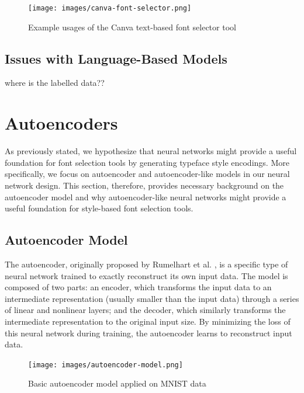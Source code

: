 \begin{figure}
    \centering
    \texttt{[image: images/canva-font-selector.png]}
    \caption{Example usages of the Canva text-based font selector tool}
    \label{fig:canva-font-selector}
\end{figure}

\subsection{Issues with Language-Based Models}

where is the labelled data??

\section{Autoencoders}

As previously stated, we hypothesize that neural networks might provide a useful foundation for font selection tools by generating typeface style encodings. More specifically, we focus on autoencoder and autoencoder-like models in our neural network design. This section, therefore, provides necessary background on the autoencoder model and why autoencoder-like neural networks might provide a useful foundation for style-based font selection tools.

\subsection{Autoencoder Model}

The autoencoder, originally proposed by Rumelhart et al. \cite{rumelhart1986}, is a specific type of neural network trained to exactly reconstruct its own input data. The model is composed of two parts: an encoder, which transforms the input data to an intermediate representation (usually smaller than the input data) through a series of linear and nonlinear layers; and the decoder, which similarly transforms the intermediate representation to the original input size. By minimizing the loss of this neural network during training, the autoencoder learns to reconstruct input data.

\begin{figure}[h]
    \centering
    \texttt{[image: images/autoencoder-model.png]}
    \caption{Basic autoencoder model applied on MNIST data}
    \label{fig:autoencoder-model}
\end{figure}

